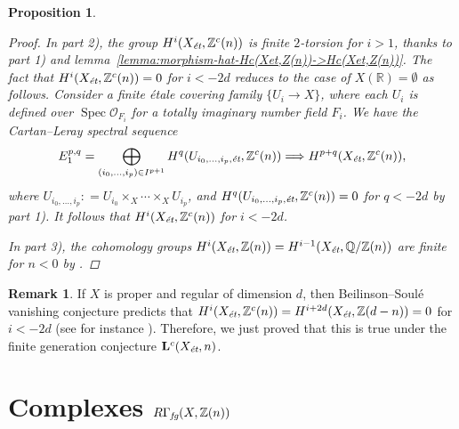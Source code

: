 \documentclass[leqno,12pt]{article}
\theoremstyle{plain}
\newtheorem{proposition}[theorem]{\indent\sc Proposition}
\theoremstyle{definition}
\newtheorem{remark}[theorem]{\indent\sc Remark}
\DeclareMathOperator{\Spec}{Spec}
\newcommand{\ZZ}{\mathbb{Z}}
\newcommand{\QQ}{\mathbb{Q}}
\newcommand{\RR}{\mathbb{R}}
\newcommand{\dfn}{\mathrel{\mathop:}=}
\newcommand{\et}{\text{\it \'{e}t}}
\newcommand{\fg}{\text{\it fg}}
\begin{document}
\begin{proposition}
\begin{proof}
    In part 2), the group $H^i (X_\et, \ZZ^c (n))$ is finite $2$-torsion for
    $i > 1$, thanks to part 1) and
    lemma~\ref{lemma:morphism-hat-Hc(Xet,Z(n))->Hc(Xet,Z(n))}. The fact that
    $H^i (X_\et, \ZZ^c (n)) = 0$ for $i < -2d$ reduces to the case of
    $X (\RR) = \emptyset$ as follows. Consider a finite \'{e}tale covering family
    $\{ U_i \to X \}$, where each $U_i$ is defined over
    $\Spec \mathcal{O}_{F_i}$ for a totally imaginary number field $F_i$.
    We have the Cartan--Leray spectral sequence
    \[ E_1^{p,q} = \bigoplus_{(i_0,\ldots,i_p) \in I^{p+1}} H^q (U_{i_0,\ldots,i_p, \et}, \ZZ^c (n))
      \Longrightarrow H^{p+q} (X_\et, \ZZ^c (n)), \]
    where $U_{i_0,\ldots,i_p} \dfn U_{i_0} \times_X \cdots \times_X U_{i_p}$, and
    $H^q (U_{i_0,\ldots,i_p, \et}, \ZZ^c (n)) = 0$ for $q < -2d$ by part 1).
    It follows that $H^i (X_\et, \ZZ^c (n))$ for $i < -2d$.

    In part 3), the cohomology groups
    $H^i (X_\et, \ZZ (n)) = H^{i-1} (X_\et, \QQ/\ZZ (n))$ are finite for $n < 0$
    by \cite[Theorem~3]{Kahn-2003}.
  \end{proof}
\end{proposition}

\begin{remark}
  If $X$ is proper and regular of dimension $d$, then Beilinson--Soul\'{e}
  vanishing conjecture predicts that
  $H^i (X_\et, \ZZ^c (n)) = H^{i+2d} (X_\et, \ZZ (d-n)) = 0$ for $i < -2d$
  (see for instance \cite[\S 4.3.4]{Kahn-2005}). Therefore, we just proved that
  this is true under the finite generation conjecture $\mathbf{L}^c (X_\et, n)$.
\end{remark}


\section{Complexes $R\Gamma_\fg (X, \ZZ(n))$}
\label{sec:RGamma-fg}
\end{document}
